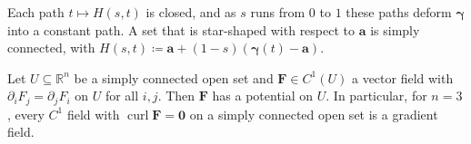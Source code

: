 Each path $t\mapsto H(s,t)$ is closed, and as $s$ runs from $0$ to $1$ these paths deform $\boldsymbol\gamma$ into a constant path. A set that is star-shaped with respect to $\mathbf a$ is simply connected, with $H(s,t)\coloneqq\mathbf a+(1-s)(\boldsymbol\gamma(t)-\mathbf a)$.

\begin{theorem}
\label{thm:simply-connected}
Let $U\subseteq\mathbb R^n$ be a simply connected open set and $\mathbf F\in C^1(U)$ a vector field with $\partial_iF_j=\partial_jF_i$ on $U$ for all $i,j$. Then $\mathbf F$ has a potential on $U$. In particular, for $n=3$, every $C^1$ field with $\operatorname{curl}\mathbf F=\mathbf0$ on a simply connected open set is a gradient field.
\end{theorem}

